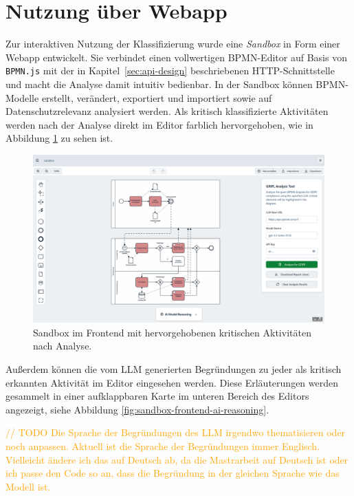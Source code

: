 \section{Nutzung über Webapp}\label{sec:nutzung-uber-webapp}

Zur interaktiven Nutzung der Klassifizierung wurde eine \emph{Sandbox} in Form einer Webapp entwickelt. Sie verbindet einen vollwertigen \ac{BPMN}-Editor auf Basis von \texttt{BPMN.js} \cite{bpmn-js} mit der in Kapitel~\ref{sec:api-design} beschriebenen HTTP-Schnittstelle und macht die Analyse damit intuitiv bedienbar. In der Sandbox können \ac{BPMN}-Modelle erstellt, verändert, exportiert und importiert sowie auf Datenschutzrelevanz analysiert werden. Als kritisch klassifizierte Aktivitäten werden nach der Analyse direkt im Editor farblich hervorgehoben, wie in Abbildung \ref{fig:sandbox-frontend-analyzed-model} zu sehen ist.

\begin{figure}
    \centering
    \includegraphics[width=\linewidth]{images/sandbox/sandbox-analyzed-model}
    \caption{Sandbox im Frontend mit hervorgehobenen kritischen Aktivitäten nach Analyse.}
    \label{fig:sandbox-frontend-analyzed-model}
\end{figure}

Außerdem können die vom \ac{LLM} generierten Begründungen zu jeder als kritisch erkannten Aktivität im Editor eingesehen werden. Diese Erläuterungen werden gesammelt in einer aufklappbaren Karte im unteren Bereich des Editors angezeigt, siehe Abbildung \ref{fig:sandbox-frontend-ai-reasoning}.

\textcolor{orange}{// TODO Die Sprache der Begründungen des LLM irgendwo thematisieren oder noch anpassen. Aktuell ist die Sprache der Begründungen immer Englisch. Vielleicht ändere ich das auf Deutsch ab, da die Mastrarbeit auf Deutsch ist oder ich passe den Code so an, dass die Begründung in der gleichen Sprache wie das Modell ist.}


